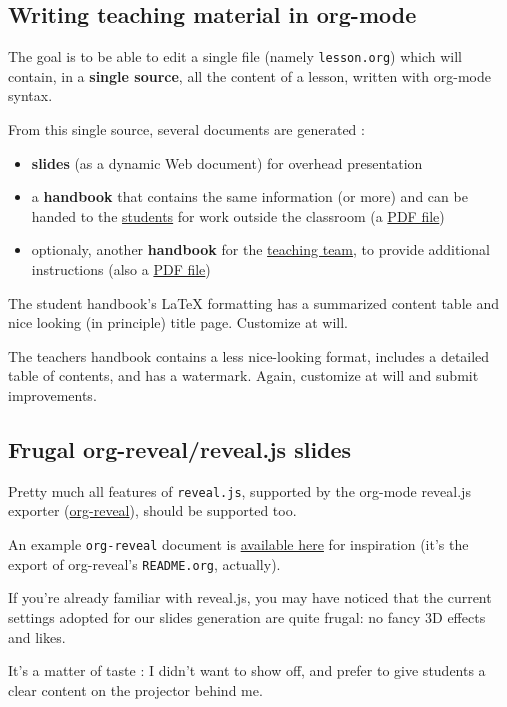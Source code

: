 \documentclass[a4paper]{article}
\begin{document}
\subsection{Writing teaching material in org-mode}
\label{sec:org1ac3dd3}

The goal is to be able to edit a single file (namely \texttt{lesson.org})
which will contain, in a \textbf{single source}, all the content of a lesson,
written with org-mode syntax.

From this single source, several documents are generated :
\begin{itemize}
\item \textbf{slides} (as a dynamic Web document) for overhead presentation
\item a \textbf{handbook} that contains the same information (or more) and can be
handed to the \uline{students} for work outside the classroom (a \href{handbook.pdf}{PDF file})
\end{itemize}

\begin{itemize}
\item optionaly, another \textbf{handbook} for the \uline{teaching team}, to provide additional instructions (also a \href{teacher-handbook.pdf}{PDF file})
\end{itemize}

\begin{NOTES}
The student handbook's \LaTeX{} formatting has a summarized content table and nice looking (in principle) title page. Customize at will.

The teachers handbook contains a less nice-looking format, includes a detailed table of contents, and has a watermark. Again, customize at will and submit improvements.
\end{NOTES}

\subsection{Frugal org-reveal/reveal.js slides}
\label{sec:org58b04ee}

Pretty much all features of \texttt{reveal.js}, supported by the org-mode reveal.js exporter (\href{https://github.com/yjwen/org-reveal/}{org-reveal}), should be supported too.

An example \texttt{org-reveal} document is \href{./elisp/org-reveal/Readme.html}{available here} for inspiration (it's the export of org-reveal's \texttt{README.org}, actually).

\begin{NOTES}
If you're already familiar with reveal.js, you may have noticed that the current settings adopted for our slides generation are quite frugal: no fancy 3D effects and likes.

It's a matter of taste : I didn't want to show off, and prefer to give students a clear content on the projector behind me.
\end{NOTES}
\end{document}
